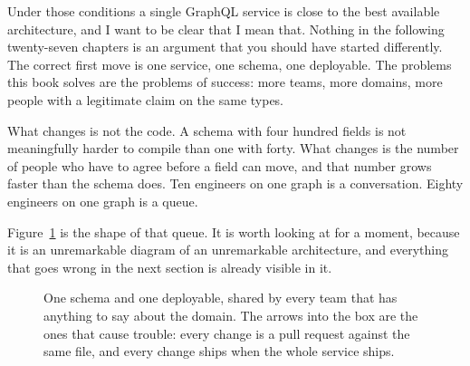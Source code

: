 Under those conditions a single GraphQL service is close to the best available
architecture, and I want to be clear that I mean that. Nothing in the following
twenty-seven chapters is an argument that you should have started differently.
The correct first move is one service, one schema, one deployable. The problems
this book solves are the problems of success: more teams, more domains, more
people with a legitimate claim on the same types.

%
What changes is not the code. A schema with four hundred fields is not
meaningfully harder to compile than one with forty. What changes is the number
of people who have to agree before a field can move, and that number grows
faster than the schema does. Ten engineers on one graph is a conversation.
Eighty engineers on one graph is a queue.

Figure~\ref{fig:ch01-one-schema-many-teams} is the shape of that queue. It is
worth looking at for a moment, because it is an unremarkable diagram of an
unremarkable architecture, and everything that goes wrong in the next section
is already visible in it.

\begin{figure}[htbp]
  \centering
  
  \caption{One schema and one deployable, shared by every team that has
  anything to say about the domain. The arrows into the box are the ones that
  cause trouble: every change is a pull request against the same file, and
  every change ships when the whole service ships.}
  \label{fig:ch01-one-schema-many-teams}
\end{figure}
